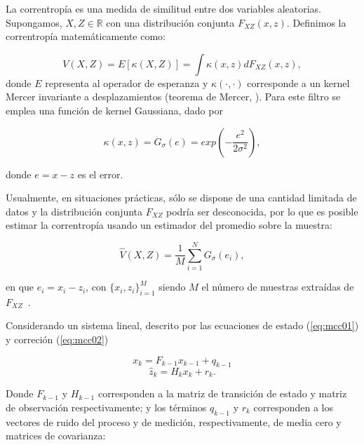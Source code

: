 La correntrop\'ia es una medida de similitud entre dos variables aleatorias. Supongamos, $X,Z \in \mathbb{R}$ con una distribuci\'on conjunta $F_{XZ} (x,z)$. Definimos la correntrop\'ia matem\'aticamente como:

\begin{equation}
V(X,Z) = E[\kappa(X,Z)] = \int \kappa(x,z) dF_{XZ} (x,z),
\label{eq:eqcorr}
\end{equation}
\noindent
donde $E$ representa al operador de esperanza y $\kappa(\cdot,\cdot)$ corresponde a un kernel Mercer invariante a desplazamientos (teorema de Mercer, \cite{mercer}). Para este filtro se emplea una funci\'on de kernel Gaussiana, dado por

\begin{equation}
\kappa(x, z) = G_{\sigma} (e) = exp \left(-\dfrac{e^2}{2\sigma^2} \right),
\label{eq:eqkappa}
\end{equation}

donde $e=x-z$ es el error.
\bigskip

Usualmente, en situaciones pr\'acticas, s\'olo se dispone de una cantidad limitada de datos y la distribuci\'on conjunta $F_{XZ}$ podr\'ia ser desconocida, por lo que es posible estimar la correntrop\'ia usando un estimador del promedio sobre la muestra:

\begin{equation}
\hat{V}(X,Z) = \dfrac{1}{M} \sum_{i=1}^N G_{\sigma} (e_i),
\label{eq:eqcoor_est}
\end{equation} 

en que $e_i = x_i - z_i$, con $\{x_i,z_i\}_{i=1}^M$ siendo $M$ el n\'umero de muestras extra\'idas de $F_{XZ}$~\cite{badong}.
\bigskip

Considerando un sistema lineal, descrito por las ecuaciones de estado (\ref{eq:mcc01}) y correci\'on (\ref{eq:mcc02}) 

\begin{equation}
x_{k} = F_{k-1}x_{k-1} + q_{k-1}
\label{eq:mcc01}
\end{equation}
\begin{equation}
\hat{z}_k = H_k x_{k} + r_k.
\label{eq:mcc02}
\end{equation}

Donde $F_{k-1}$ y $H_{k-1}$ corresponden a la matriz de transici\'on de estado y matriz de observaci\'on respectivamente; y los t\'erminos $q_{k-1}$ y $r_k$ corresponden a los vectores de ruido del proceso y de medici\'on, respectivamente, de media cero y matrices de covarianza:
\bigskip

